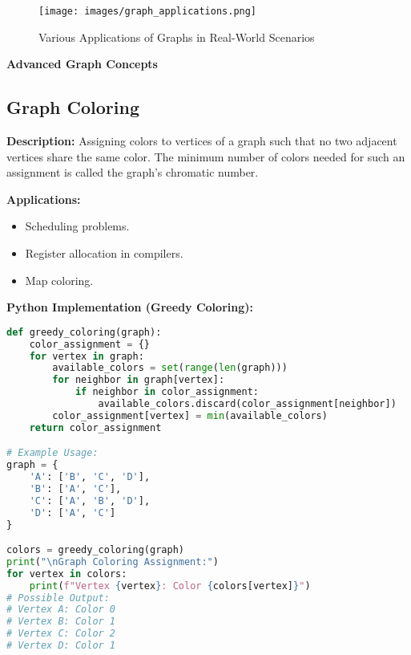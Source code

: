 \begin{figure}[ht]
    \centering
    \texttt{[image: images/graph\_applications.png]}
    \caption{Various Applications of Graphs in Real-World Scenarios}
    \label{fig:graph_applications}
\end{figure}

\textbf{Advanced Graph Concepts}

\subsection{Graph Coloring}

\textbf{Description:}  
Assigning colors to vertices of a graph such that no two adjacent vertices share the same color. The minimum number of colors needed for such an assignment is called the graph's chromatic number.

\textbf{Applications:}
\begin{itemize}
    \item Scheduling problems.
    \item Register allocation in compilers.
    \item Map coloring.
\end{itemize}

\textbf{Python Implementation (Greedy Coloring):}

\begin{lstlisting}[language=Python, xleftmargin=0.02\textwidth, xrightmargin=0.02\textwidth]
def greedy_coloring(graph):
    color_assignment = {}
    for vertex in graph:
        available_colors = set(range(len(graph)))
        for neighbor in graph[vertex]:
            if neighbor in color_assignment:
                available_colors.discard(color_assignment[neighbor])
        color_assignment[vertex] = min(available_colors)
    return color_assignment

# Example Usage:
graph = {
    'A': ['B', 'C', 'D'],
    'B': ['A', 'C'],
    'C': ['A', 'B', 'D'],
    'D': ['A', 'C']
}

colors = greedy_coloring(graph)
print("\nGraph Coloring Assignment:")
for vertex in colors:
    print(f"Vertex {vertex}: Color {colors[vertex]}")
# Possible Output:
# Vertex A: Color 0
# Vertex B: Color 1
# Vertex C: Color 2
# Vertex D: Color 1
\end{lstlisting}

